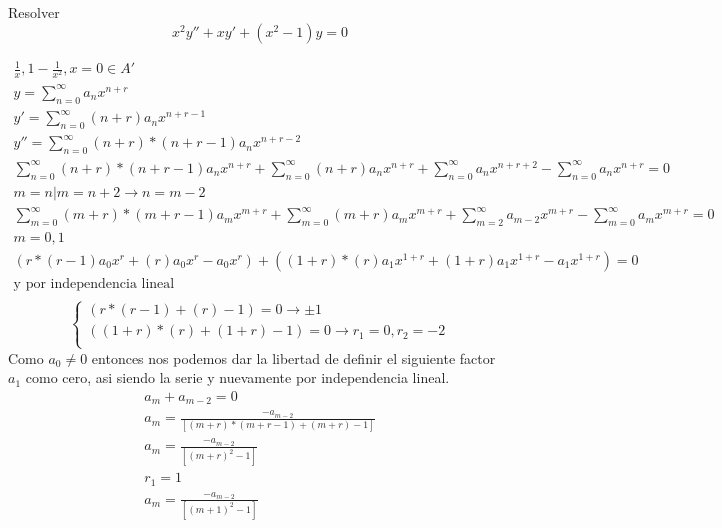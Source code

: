\begin{prob}
  Resolver $$x^2y'' + xy' + (x^2 - 1)y = 0$$  
\end{prob}
\begin{mdframed}

\begin{gather*}
   \frac{1}{x}, 1-\frac{1}{x^2}, x =0 \in A'\\
    y = \sum_{n=0}^{\infty} a_n x^{n+r}\\
    y' = \sum_{n=0}^{\infty} ({n+r})a_n x^{n+r-1}\\
    y'' = \sum_{n=0}^{\infty}  ({n+r})*({n+r-1}) a_n x^{n+r-2}\\
    \sum_{n=0}^{\infty}  ({n+r})*({n+r-1}) a_n x^{n+r}+ \sum_{n=0}^{\infty} ({n+r})a_n x^{n+r}+\sum_{n=0}^{\infty} a_n x^{n+r+2}-\sum_{n=0}^{\infty} a_n x^{n+r}=0\\
    m = n | m = n+2 \longrightarrow n = m-2\\
    \sum_{m=0}^{\infty}  ({m+r})*({m+r-1}) a_m x^{m+r}+ \sum_{m=0}^{\infty} ({m+r})a_m x^{m+r}+\sum_{m=2}^{\infty} a_{m-2} x^{m+r}-\sum_{m=0}^{\infty} a_m x^{m+r}=0\\
    m =0, 1\\
    (r*(r-1)a_0x^{r}+({r})a_0 x^{r}-a_0 x^{r})  +  (({1+r})*({r}) a_1 x^{1+r}+ ({1+r})a_1 x^{1+r}-a_1 x^{1+r})=0\\
    \text{y por independencia lineal}\\
\end{gather*}
  \begin{equation}
    \begin{cases}
        (r*(r-1)+({r})-1)=0\longrightarrow \pm1\\
        (({1+r})*({r})+ ({1+r})-1)=0\longrightarrow r_1 =0, r_2=-2\\
    \end{cases}
\end{equation}
Como $a_0 \neq 0$ entonces nos podemos dar la libertad de definir el siguiente factor $a_1$ como cero, asi siendo la serie y nuevamente por independencia lineal.
\begin{gather*}
       [({m+r})*({m+r-1})+ ({m+r}) -1]a_m+ a_{m-2} =0\\
       a_m=\frac{-a_{m-2}}{ [({m+r})*({m+r-1})+ ({m+r}) -1]}\\
       a_m=\frac{-a_{m-2}}{ [({m+r})^2 -1]}\\
       r_1 = 1\\
       a_m=\frac{-a_{m-2}}{ [({m+1})^2 -1]}\\

\end{gather*}
\end{mdframed}
